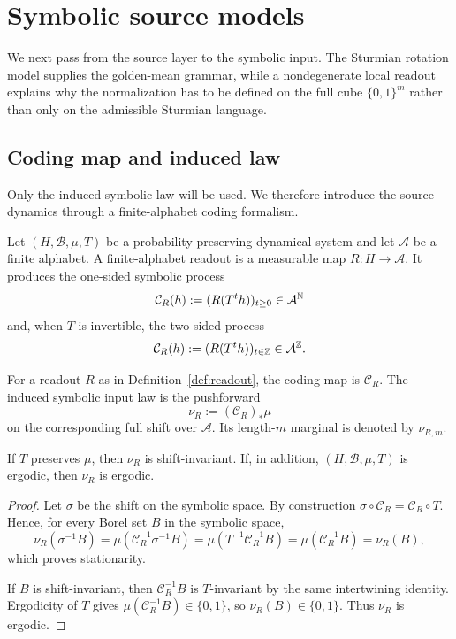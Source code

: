 \section{Symbolic source models}\label{sec:readout}

We next pass from the source layer to the symbolic input. The Sturmian rotation model supplies the golden-mean grammar, while a nondegenerate local readout explains why the normalization has to be defined on the full cube $\{0,1\}^m$ rather than only on the admissible Sturmian language.

\subsection{Coding map and induced law}\label{sec:readout:maps}

Only the induced symbolic law will be used. We therefore introduce the source dynamics through a finite-alphabet coding formalism.

\begin{definition}\label{def:readout}
Let $(H,\mathcal B,\mu,T)$ be a probability-preserving dynamical system and let
$\mathcal A$ be a finite alphabet.  A finite-alphabet readout is a measurable
map $R:H\to\mathcal A$.  It produces the one-sided symbolic process
\[
  \mathcal C_R(h):=(R(T^t h))_{t\ge0}\in\mathcal A^{\mathbb{N}}
\]
and, when $T$ is invertible, the two-sided process
\[
  \mathcal C_R(h):=(R(T^t h))_{t\in\mathbb{Z}}\in\mathcal A^{\mathbb{Z}}.
\]
\end{definition}

\begin{definition}\label{def:coding-law}
For a readout $R$ as in Definition~\ref{def:readout}, the coding map is
$\mathcal C_R$.  The induced symbolic input law is the pushforward
\[
  \nu_R:=(\mathcal C_R)_*\mu
\]
on the corresponding full shift over $\mathcal A$.  Its length-$m$ marginal is
denoted by $\nu_{R,m}$.
\end{definition}

\begin{proposition}\label{prop:induced-law}
If $T$ preserves $\mu$, then $\nu_R$ is shift-invariant.  If, in addition,
$(H,\mathcal B,\mu,T)$ is ergodic, then $\nu_R$ is ergodic.
\end{proposition}

\begin{proof}
Let $\sigma$ be the shift on the symbolic space.  By construction
$\sigma\circ\mathcal C_R=\mathcal C_R\circ T$.  Hence, for every Borel set
$B$ in the symbolic space,
\[
\nu_R(\sigma^{-1}B)
=\mu(\mathcal C_R^{-1}\sigma^{-1}B)
=\mu(T^{-1}\mathcal C_R^{-1}B)
=\mu(\mathcal C_R^{-1}B)
=\nu_R(B),
\]
which proves stationarity.

If $B$ is shift-invariant, then $\mathcal C_R^{-1}B$ is $T$-invariant by the
same intertwining identity.  Ergodicity of $T$ gives
$\mu(\mathcal C_R^{-1}B)\in\{0,1\}$, so $\nu_R(B)\in\{0,1\}$.  Thus $\nu_R$
is ergodic.
\end{proof}

